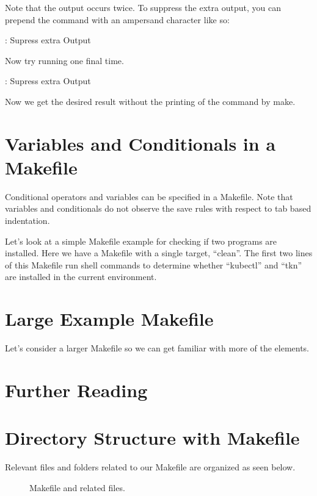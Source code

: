 \justify{}
Note that the output occurs twice. To suppress the extra output, you can prepend the command with an ampersand character like so:

\begin{mybox}{\thetcbcounter: Supress extra Output}
	
\end{mybox}

\justify{}
Now try running one final time.

\begin{mybox}{\thetcbcounter: Supress extra Output}
	
\end{mybox}

\justify{}
Now we get the desired result without the printing of the command
by make.

\section{Variables and Conditionals in a Makefile}

\justify{}
Conditional operators and variables can be specified in a Makefile. Note that variables and conditionals do not observe the save rules with respect to tab based indentation.

\justify{}
Let's look at a simple Makefile example for checking if two programs are installed. Here we have a Makefile
with a single target, ``clean''. The first two lines of this Makefile run shell commands to determine 
whether ``kubectl'' and ``tkn'' are installed in the current environment. 

\begin{mybox}{\thetcbcounter: Conditionals and Variable Example}
	}}code/23-makefiles/6b-Makefile}
\end{mybox}

\section{Large Example Makefile}
\justify{}
Let's consider a larger Makefile so we can get familiar with more of the elements.



\section{Further Reading}

\section{Directory Structure with Makefile}
\justify{}
Relevant files and folders related to our Makefile are organized as seen
below.

\begin{figure}[!htb]
	
	\caption{Makefile and related files.}
\label{makefile}
\end{figure}

